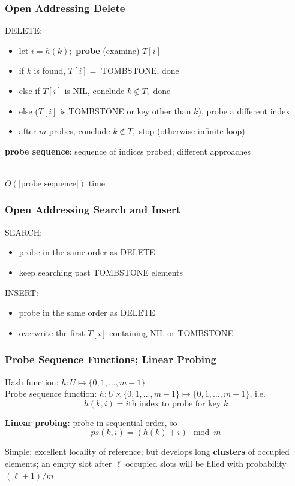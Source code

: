 \documentclass{beamer}
\newcommand{\stanza}{ \\~\ }
\begin{document}
\begin{frame} \frametitle{Open Addressing Delete}
DELETE:
\begin{itemize}
  \item let $i=h(k);$ \textbf{probe} (examine) $T[i]$
  \item if $k$ is found, $T[i]=$ TOMBSTONE, done
  \item else if $T[i]$ is NIL, conclude $k \notin T,$ done
  \item else ($T[i]$ is TOMBSTONE or key other than $k$), probe a different index
  \item after $m$ probes, conclude $k \notin T,$ stop (otherwise infinite loop)
\end{itemize}
\vspace{.5cm}
\textbf{probe sequence}: sequence of indices probed; different approaches \stanza

$O(|\text{probe sequence}|)$ time
\end{frame}

\begin{frame} \frametitle{Open Addressing Search and Insert}
SEARCH:
\begin{itemize}
  \item probe in the same order as DELETE
  \item keep searching past TOMBSTONE elements
\end{itemize}
\vspace{.5cm}
INSERT:
\begin{itemize}
  \item probe in the same order as DELETE
  \item overwrite the first $T[i]$ containing NIL or TOMBSTONE
\end{itemize}
\end{frame}

\begin{frame} \frametitle{Probe Sequence Functions; Linear Probing}
Hash function: $h : U \mapsto \{0, 1, \ldots, m-1 \}$ \\
Probe sequence function:
$h : U \times \{0, 1, \ldots, m-1 \} \mapsto \{ 0, 1, \ldots, m-1 \}$,
i.e. \[ h(k, i) = i\text{th index to probe for key } k \]

\textbf{Linear probing:} probe in sequential order, so
\[ ps(k, i) = (h(k) + i) \mod m \]

Simple; excellent locality of reference; but develops long \textbf{clusters} of
occupied elements; an empty slot after $\ell$ occupied slots will be filled
with probability $(\ell+1)/m$
\end{frame}
\end{document}
